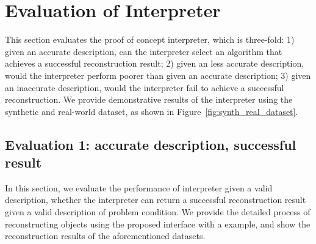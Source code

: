 \section{Evaluation of Interpreter}
\label{sec:eval_interp}
This section evaluates the proof of concept interpreter, which is three-fold: 1) given an accurate description, can the interpreter select an algorithm that achieves a successful reconstruction result; 2) given an less accurate description, would the interpreter perform poorer than given an accurate description; 3) given an inaccurate description, would the interpreter fail to achieve a successful reconstruction. We provide demonstrative results of the interpreter using the synthetic and real-world dataset, as shown in Figure~\ref{fig:synth_real_dataset}.

\subsection{Evaluation 1: accurate description, successful result}
In this section, we evaluate the performance of interpreter given a valid description, \ie whether the interpreter can return a successful reconstruction result given a valid description of problem condition. We provide the detailed process of reconstructing objects using the proposed interface with a example, and show the reconstruction results of the aforementioned datasets.


